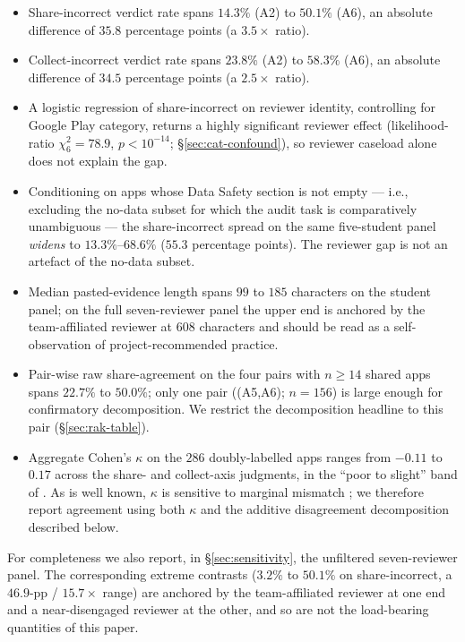\documentclass[11pt,a4paper]{article}
\newcommand{\Acc}[1]{\textsf{A#1}}
\begin{document}
\begin{itemize}[leftmargin=*,nosep,topsep=2pt]
\item Share-incorrect verdict rate spans $14.3\%$ (\Acc{2}) to
       $50.1\%$ (\Acc{6}), an absolute difference of $35.8$ percentage
       points (a $3.5{\times}$ ratio).
\item Collect-incorrect verdict rate spans $23.8\%$ (\Acc{2}) to
       $58.3\%$ (\Acc{6}), an absolute difference of $34.5$ percentage
       points (a $2.5{\times}$ ratio).
\item A logistic regression of share-incorrect on reviewer identity,
       controlling for Google Play category, returns a highly
       significant reviewer effect (likelihood-ratio
       $\chi^2_{6}=78.9$, $p<10^{-14}$;
       \S\ref{sec:cat-confound}), so reviewer caseload alone does not
       explain the gap.
\item Conditioning on apps whose Data Safety section is not empty
       --- i.e., excluding the no-data subset for which the audit
       task is comparatively unambiguous --- the share-incorrect
       spread on the same five-student panel \emph{widens} to
       $13.3\%$--$68.6\%$ ($55.3$ percentage points). The reviewer
       gap is not an artefact of the no-data subset.
\item Median pasted-evidence length spans $99$ to $185$ characters
       on the student panel; on the full seven-reviewer panel the
       upper end is anchored by the team-affiliated reviewer at
       $608$ characters and should be read as a self-observation of
       project-recommended practice.
\item Pair-wise raw share-agreement on the four pairs with $n\ge14$
       shared apps spans $22.7\%$ to $50.0\%$; only one pair
       ((\Acc{5},\Acc{6}); $n=156$) is large enough for confirmatory
       decomposition. We restrict the decomposition headline to this
       pair (\S\ref{sec:rak-table}).
\item Aggregate Cohen's $\kappa$ on the $286$ doubly-labelled apps
       ranges from $-0.11$ to $0.17$ across the share- and
       collect-axis judgments, in the ``poor to slight'' band of
       \citet{landis1977measurement}. As is well known, $\kappa$ is
       sensitive to marginal mismatch
       \citep{feinstein1990high,byrt1993bias}; we therefore report
       agreement using both $\kappa$ and the additive disagreement
       decomposition described below.
\end{itemize}

For completeness we also report, in \S\ref{sec:sensitivity}, the
unfiltered seven-reviewer panel. The corresponding extreme contrasts
($3.2\%$ to $50.1\%$ on share-incorrect, a $46.9$-pp / $15.7{\times}$
range) are anchored by the team-affiliated reviewer at one end and a
near-disengaged reviewer at the other, and so are not the load-bearing
quantities of this paper.
\end{document}
